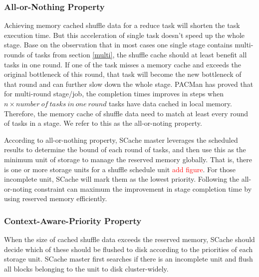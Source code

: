 \subsubsection{All-or-Nothing Property}
Achieving memory cached shuffle data for a reduce task will shorten the task execution time. But this acceleration of single task doesn't speed up the whole stage. Base on the observation that in most cases one single stage contains multi-rounds of tasks from section \ref{multi}, the shuffle cache should at least benefit all tasks in one round. If one of the task misses a memory cache and exceeds the original bottleneck of this round, that task will become the new bottleneck of that round and can further slow down the whole stage. PACMan\cite{pacman} has proved that for multi-round stage/job, the completion times improves in steps when $n\times number\ of\ tasks\ in\ one\ round$ tasks have data cached in local memory. Therefore, the memory cache of shuffle data need to match at least every round of tasks in a stage. We refer to this as the all-or-noting property. 

According to all-or-nothing property, SCache master leverages the scheduled results to determine the bound of each round of tasks, and then use this as the minimum unit of storage to manage the reserved memory globally. That is, there is one or more storage units for a shuffle schedule unit \textcolor{red}{add figure}. For those incomplete unit, SCache will mark them as the lowest priority. Following the all-or-noting constraint can maximum the improvement in stage completion time by using reserved memory efficiently.

\subsubsection{Context-Aware-Priority Property}
When the size of cached shuffle data exceeds the reserved memory, SCache should decide which of these should be flushed to disk according to the priorities of each storage unit. SCache master first searches if there is an incomplete unit and flush all blocks belonging to the unit to disk cluster-widely. 

